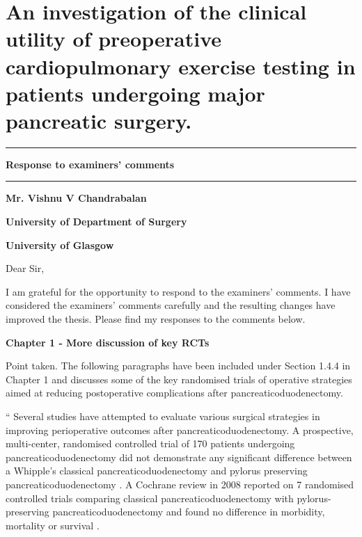 
\chapter*{An investigation of the clinical utility of preoperative cardiopulmonary exercise testing in patients undergoing major pancreatic surgery.}


\vfill

\hrule
\vfill
{\LARGE \textbf{Response to examiners' comments}}
\vfill
\hrule

\vfill

\textbf{Mr. Vishnu V Chandrabalan}

\textbf{University of Department of Surgery}

\textbf{University of Glasgow}

\vfill

\clearpage
Dear Sir,
	
I am grateful for the opportunity to respond to the examiners' comments. 
I have considered the examiners' comments carefully and the resulting changes have improved the thesis. 
Please find my responses to the comments below.
	
\textbf{Chapter 1 - More discussion of key RCTs}

	Point taken.	
	The following paragraphs have been included under Section 1.4.4 in Chapter 1 and discusses some of the key randomised trials of operative strategies aimed at reducing postoperative complications after pancreaticoduodenectomy.
	
	\textquotedblleft
	Several studies have attempted to evaluate various surgical strategies in improving perioperative outcomes after pancreaticoduodenectomy. 
	A prospective, multi-center, randomised controlled trial of 170 patients undergoing pancreaticoduodenectomy did not demonstrate any significant difference between a Whipple's classical pancreaticoduodenectomy  and pylorus preserving pancreaticoduodenectomy \parencite{tran_pylorus_2004}. 
	A Cochrane review in 2008 reported on 7 randomised controlled trials comparing classical pancreaticoduodenectomy with pylorus-preserving pancreaticoduodenectomy  and found no difference in morbidity, mortality or survival \parencite{diener_pancreaticoduodenectomy_2008}. 
	

